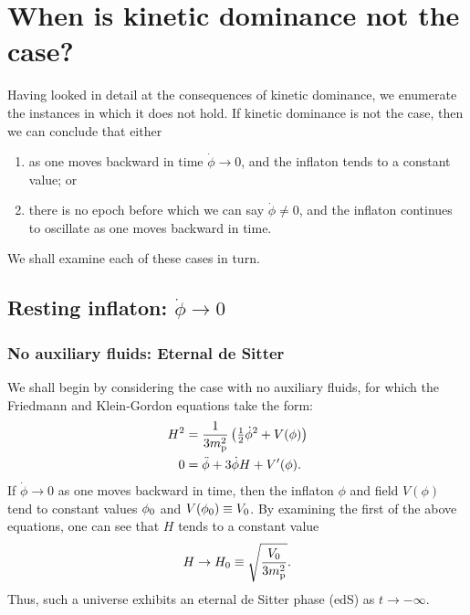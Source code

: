 \section{When is kinetic dominance not the case?}
\label{sec:When_is_kinetic_dominance_not_the_case?}
Having looked in detail at the consequences of kinetic dominance, we
enumerate the instances in which it does not hold. If kinetic
dominance is not the case, then we can conclude that either
%
\begin{enumerate}
    \item as one moves backward in time $\dot{\phi}\to 0$, and the
      inflaton tends to a constant value; or
    \item there is no epoch before which we can say $\dot{\phi}\ne 0$,
      and the inflaton continues to oscillate as one moves backward in
      time.
\end{enumerate}
%
We shall examine each of these cases in turn.

\subsection{Resting inflaton: $\dot{\phi}\to 0$}


\subsubsection{No auxiliary fluids: Eternal de Sitter}
We shall begin by considering the case with no auxiliary fluids, for
which the Friedmann  and Klein-Gordon
 equations take the form:
%
\begin{align}
  H^2 
  &=
  \frac{1}{3m_{\mathrm{p}}^2}\left({\textstyle\frac{1}{2}}\dot{\phi}^2 + V(\phi) \right)
  \label{eqn:Friedmann_dotphi_to_zero_no_fluid} 
  \\
  0
  &=
  \ddot{\phi} +3\dot{\phi}H + V^\prime(\phi).
  \label{eqn:Klein_Gordon_dotphi_to_zero_no_fluid}
\end{align}
%
If $\dot{\phi}\to 0$ as one moves backward in time, then the inflaton
$\phi$ and field $V(\phi)$ tend to constant values $\phi_0$ and
$V(\phi_0)\equiv V_0$. By examining the first of the above equations,
one can see that $H$ tends to a constant value 
%
\begin{equation}
  H\to H_0 \equiv \sqrt{\frac{V_0}{3m_{\mathrm{p}}^2}}.
\end{equation}
%
Thus, such a universe exhibits an eternal de Sitter phase (edS) as
$t\to-\infty$.

